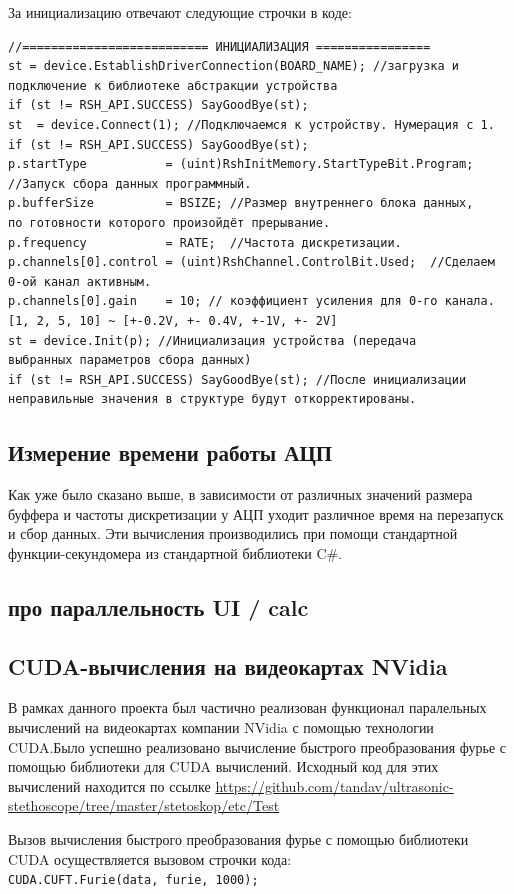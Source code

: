 За инициализацию отвечают следующие строчки в коде:
\begin{verbatim}
//========================== ИНИЦИАЛИЗАЦИЯ ================        
st = device.EstablishDriverConnection(BOARD_NAME); //загрузка и 
подключение к библиотеке абстракции устройства
if (st != RSH_API.SUCCESS) SayGoodBye(st);
st  = device.Connect(1); //Подключаемся к устройству. Нумерация с 1.
if (st != RSH_API.SUCCESS) SayGoodBye(st);
p.startType           = (uint)RshInitMemory.StartTypeBit.Program; 
//Запуск сбора данных программный. 
p.bufferSize          = BSIZE; //Размер внутреннего блока данных, 
по готовности которого произойдёт прерывание.
p.frequency           = RATE;  //Частота дискретизации.
p.channels[0].control = (uint)RshChannel.ControlBit.Used;  //Сделаем 0-ой канал активным.
p.channels[0].gain    = 10; // коэффициент усиления для 0-го канала. 
[1, 2, 5, 10] ~ [+-0.2V, +- 0.4V, +-1V, +- 2V]
st = device.Init(p); //Инициализация устройства (передача 
выбранных параметров сбора данных)
if (st != RSH_API.SUCCESS) SayGoodBye(st); //После инициализации 
неправильные значения в структуре будут откорректированы.
\end{verbatim}

\subsection{Измерение времени работы АЦП}
Как уже было сказано выше, в зависимости от различных значений размера буффера и частоты дискретизации у АЦП уходит различное время на перезапуск и сбор данных. Эти вычисления производились при помощи стандартной функции-секундомера из стандартной библиотеки C\#.

\subsection{про параллельность UI / calc}
\subsection{CUDA-вычисления на видеокартах NVidia}
В рамках данного проекта был частично реализован функционал паралельных вычислений на видеокартах компании NVidia с помощью технологии CUDA.Было успешно реализовано вычисление быстрого преобразования фурье с помощью библиотеки для CUDA вычислений. Исходный код для этих вычислений находится по ссылке \url{https://github.com/tandav/ultrasonic-stethoscope/tree/master/stetoskop/etc/Test}

Вызов вычисления быстрого преобразования фурье с помощью библиотеки CUDA осуществляется вызовом строчки кода:\\
\verb|CUDA.CUFT.Furie(data, furie, 1000);|

